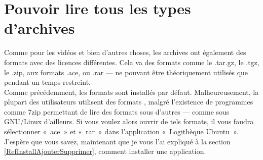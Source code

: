 \section{Pouvoir lire tous les types d'archives}
Comme pour les vidéos et bien d'autres choses, les archives ont également des formats avec des licences différentes. Cela va des formats  comme le .tar.gz, le .tgz, le .zip, aux formats  .ace, ou .rar --- ne pouvant être théoriquement utilisés que pendant un temps restreint.\\
Comme précédemment, les formats  sont installés par défaut. Malheureusement, la plupart des utilisateurs utilisent des formats , malgré l'existence de programmes comme 7zip permettant de lire des formats  sous d'autres  --- comme sous GNU/Linux d'ailleurs. Si vous voulez alors ouvrir de tels formats, il vous faudra sélectionner «~ace~» et «~rar~» dans l'application «~Logithèque Ubuntu~». J'espère que vous savez, maintenant que je vous l'ai expliqué à la section \ref{RefInstallAjouterSupprimer}, comment installer une application.
